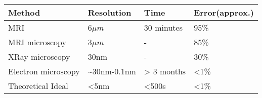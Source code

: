 \setlength{\tabcolsep}{4ex}
\renewcommand{\arraystretch}{1.1}
\begin{table}[ht]
    \centering
    \begin{tabular}{@{}llll@{}}
        Method              & Resolution                 & Time    & Error(approx.) \\
        \hline
        MRI                 & 6$\mu m$                   & 30 minutes  & 95\%           \\
        MRI microscopy      & 3$\mu m$                   & -       & 85\%           \\
        XRay microscopy     & 30nm                       & -       & 30\%           \\
        Electron microscopy & \textasciitilde 30nm-0.1nm & > 3 months & <1\%           \\
        Theoretical Ideal   & <5nm                       & <500s   & <1\%           \\
        \hline
    \end{tabular}
    \label{imagemethodcomparison1}
\end{table}
\setlength{\tabcolsep}{1ex}